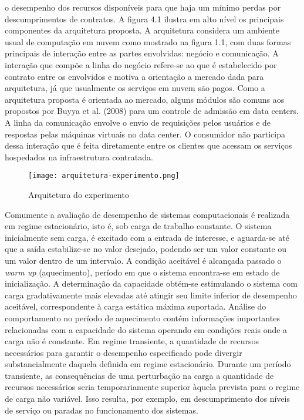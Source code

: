 o desempenho dos recursos disponíveis para que haja um mínimo perdas por descumprimentos de
contratos. A figura 4.1 ilustra em alto nível os principais componentes da arquitetura proposta.
A arquitetura considera um ambiente usual de computação em nuvem como mostrado na figura
1.1, com duas formas principais de interação entre as partes envolvidas: negócio e comunicação.
A interação que compõe a linha do negócio refere-se ao que é estabelecido por contrato entre os
envolvidos e motiva a orientação a mercado dada para arquitetura, já que usualmente os serviços
em nuvem são pagos. Como a arquitetura proposta é orientada ao mercado, alguns módulos são
comuns aos propostos por Buyya et al. (2008) para um controle de admissão em data centers.
A linha da comunicação envolve o envio de requisições pelos usuários e de respostas pelas máquinas
virtuais no data center. O consumidor não participa dessa interação que é feita diretamente
entre os clientes que acessam os serviços hospedados na infraestrutura contratada.

\begin{figure}[!htb]
	\caption{Arquitetura do experimento}
	\label{fig:arquitetura-experimento}
	\centering
	\texttt{[image: arquitetura-experimento.png]}
	\fautor
\end{figure}

Comumente a avaliação de desempenho de sistemas computacionais é realizada em regime estacionário, isto é, sob carga de trabalho constante.  O sistema inicialmente sem carga, é excitado com a entrada de interesse, e aguarda-se até que a saída estabilize-se no valor desejado, podendo ser um valor constante ou um valor dentro de um intervalo. A condição aceitável é alcançada passado o \textit{warm up} (aquecimento), período em que o sistema encontra-se em estado de inicialização. A determinação da capacidade obtém-se estimulando o sistema com carga gradativamente mais elevadas até atingir seu limite inferior de desempenho aceitável, correspondente à carga estática máxima suportada. Análise do comportamento no período de aquecimento contém informações importantes relacionadas com a capacidade do sistema operando em condições reais onde a carga não é constante.
Em regime transiente, a quantidade de recursos necessários para garantir o desempenho especificado pode divergir substancialmente daquela definida em regime estacionário. Durante um período transiente, as consequências de uma perturbação na carga a quantidade de recursos necessários seria temporariamente superior àquela prevista para o regime de carga não variável. Isso resulta, por exemplo, em descumprimento dos níveis de serviço ou paradas no funcionamento dos sistemas.

